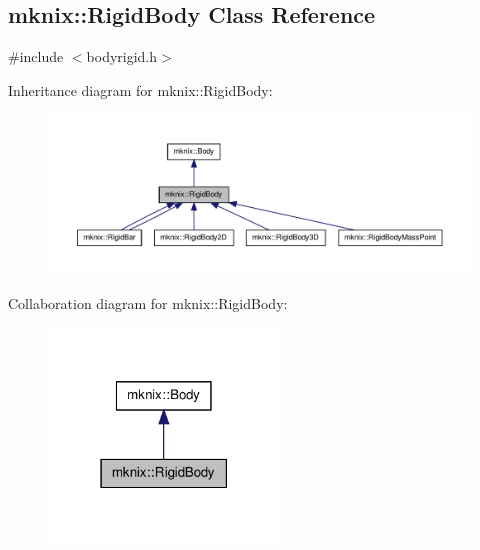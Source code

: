 \hypertarget{classmknix_1_1_rigid_body}{\subsection{mknix\-:\-:Rigid\-Body Class Reference}
\label{classmknix_1_1_rigid_body}
}


{\ttfamily \#include $<$bodyrigid.\-h$>$}



Inheritance diagram for mknix\-:\-:Rigid\-Body\-:\nopagebreak
\begin{figure}[H]
\begin{center}
\leavevmode
\includegraphics[width=350pt]{de/d58/classmknix_1_1_rigid_body__inherit__graph}
\end{center}
\end{figure}


Collaboration diagram for mknix\-:\-:Rigid\-Body\-:\nopagebreak
\begin{figure}[H]
\begin{center}
\leavevmode
\includegraphics[width=174pt]{da/d0d/classmknix_1_1_rigid_body__coll__graph}
\end{center}
\end{figure}
